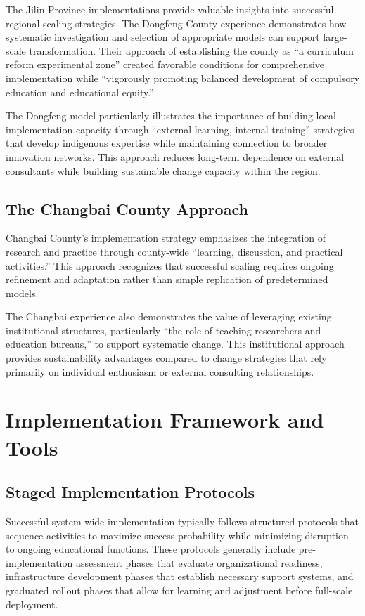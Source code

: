 \documentclass[
  Letterpaper,
]{scrbook}
\begin{document}
The Jilin Province implementations provide valuable insights into
successful regional scaling strategies. The Dongfeng County experience
demonstrates how systematic investigation and selection of appropriate
models can support large-scale transformation. Their approach of
establishing the county as ``a curriculum reform experimental zone''
created favorable conditions for comprehensive implementation while
``vigorously promoting balanced development of compulsory education and
educational equity.''

The Dongfeng model particularly illustrates the importance of building
local implementation capacity through ``external learning, internal
training'' strategies that develop indigenous expertise while
maintaining connection to broader innovation networks. This approach
reduces long-term dependence on external consultants while building
sustainable change capacity within the region.

\subsection{The Changbai County
Approach}\label{the-changbai-county-approach}

Changbai County's implementation strategy emphasizes the integration of
research and practice through county-wide ``learning, discussion, and
practical activities.'' This approach recognizes that successful scaling
requires ongoing refinement and adaptation rather than simple
replication of predetermined models.

The Changbai experience also demonstrates the value of leveraging
existing institutional structures, particularly ``the role of teaching
researchers and education bureaus,'' to support systematic change. This
institutional approach provides sustainability advantages compared to
change strategies that rely primarily on individual enthusiasm or
external consulting relationships.

\section{Implementation Framework and
Tools}\label{implementation-framework-and-tools}

\subsection{Staged Implementation
Protocols}\label{staged-implementation-protocols}

Successful system-wide implementation typically follows structured
protocols that sequence activities to maximize success probability while
minimizing disruption to ongoing educational functions. These protocols
generally include pre-implementation assessment phases that evaluate
organizational readiness, infrastructure development phases that
establish necessary support systems, and graduated rollout phases that
allow for learning and adjustment before full-scale deployment.
\end{document}
